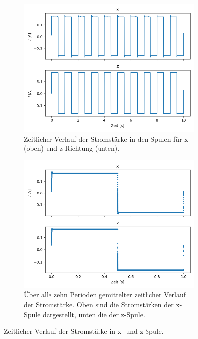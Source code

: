 \documentclass[page,pdftex,12pt,a4paper,twoside,openright]{scrbook}
\begin{document}
\begin{figure}
\centering
\begin{subfigure}[t]{.5\textwidth}
\includegraphics[width=\textwidth]{./img/strom.png}
\caption{Zeitlicher Verlauf der Stromstärke in den Spulen für x- (oben) und z-Richtung (unten).}
\label{fig-stromraw}
\end{subfigure}%
\begin{subfigure}[t]{.5\textwidth}
\includegraphics[width=\textwidth]{./img/strom_avg.png}
\caption{Über alle zehn Perioden gemittelter zeitlicher Verlauf der Stromstärke. Oben sind die Stromstärken der x-Spule dargestellt, unten die der z-Spule.}
\label{fig-mag_avg}
\end{subfigure}
\caption{Zeitlicher Verlauf der Stromstärke in x- und z-Spule.}
\end{figure}
\end{document}
